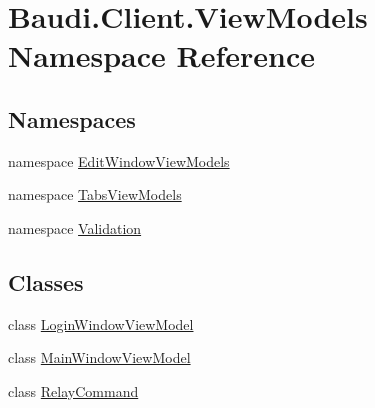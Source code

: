 \hypertarget{namespace_baudi_1_1_client_1_1_view_models}{}\section{Baudi.\+Client.\+View\+Models Namespace Reference}
\label{namespace_baudi_1_1_client_1_1_view_models}
\subsection*{Namespaces}
\begin{DoxyCompactItemize}
\item 
namespace \hyperlink{namespace_baudi_1_1_client_1_1_view_models_1_1_edit_window_view_models}{Edit\+Window\+View\+Models}
\item 
namespace \hyperlink{namespace_baudi_1_1_client_1_1_view_models_1_1_tabs_view_models}{Tabs\+View\+Models}
\item 
namespace \hyperlink{namespace_baudi_1_1_client_1_1_view_models_1_1_validation}{Validation}
\end{DoxyCompactItemize}
\subsection*{Classes}
\begin{DoxyCompactItemize}
\item 
class \hyperlink{class_baudi_1_1_client_1_1_view_models_1_1_login_window_view_model}{Login\+Window\+View\+Model}
\item 
class \hyperlink{class_baudi_1_1_client_1_1_view_models_1_1_main_window_view_model}{Main\+Window\+View\+Model}
\item 
class \hyperlink{class_baudi_1_1_client_1_1_view_models_1_1_relay_command}{Relay\+Command}
\end{DoxyCompactItemize}
